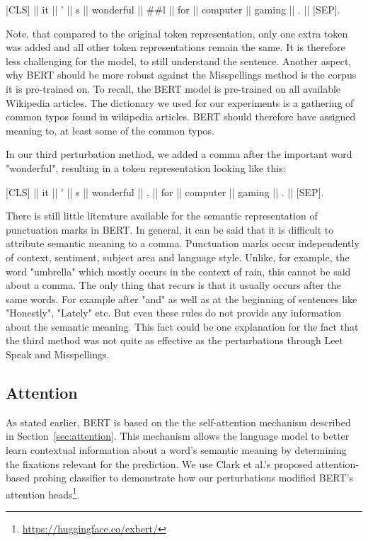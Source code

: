 {[}CLS{]}  ||  it  ||  '  ||  s  ||  wonderful  ||  \#\#l  ||  for  ||  computer  ||  gaming  ||  .  ||  {[}SEP{]}.

Note, that compared to the original token representation, only one extra token was added and all other token representations remain the same. It is therefore less challenging for the model, to still understand the sentence. Another aspect, why BERT should be more robust against the Misspellings method is the corpus it is pre-trained on. To recall, the BERT model is pre-trained on all available Wikipedia articles. The dictionary we used for our experiments is a gathering of common typos found in wikipedia articles. BERT should therefore have assigned meaning to, at least some of the common typos.


In our third perturbation method, we added a comma after the important word "wonderful", resulting in a token representation looking like this:

{[}CLS{]}  ||  it  ||  '  ||  s  ||  wonderful  || , ||  for  ||  computer  ||  gaming  ||  .  ||  {[}SEP{]}.

There is still little literature available for the semantic representation of punctuation marks in BERT. In general, it can be said that it is difficult to attribute semantic meaning to a comma. Punctuation marks occur independently of context, sentiment, subject area and language style. Unlike, for example, the word "umbrella" which mostly occurs in the context of rain, this cannot be said about a comma. The only thing that recurs is that it usually occurs after the same words. For example after "and" as well as at the beginning of sentences like "Honestly", "Lately" etc. But even these rules do not provide any information about the semantic meaning. This fact could be one explanation for the fact that the third method was not quite as effective as the perturbations through Leet Speak and Misspellings.


\subsection{Attention}
As stated earlier, BERT is based on the the self-attention mechanism described in Section~\ref{sec:attention}. This mechanism allows the language model to better learn contextual information about a word’s semantic meaning by determining the fixations relevant for the prediction. We use Clark et al.'s proposed attention-based probing classifier to demonstrate how our perturbations modified BERT's attention heads\footnote{\url{https://huggingface.co/exbert/}}\cite{clark2019does}. 

